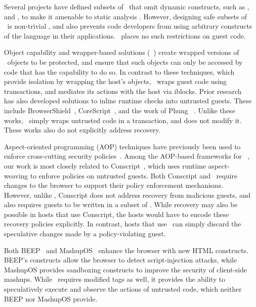 %
Several projects have defined subsets of \js\ that omit dynamic constructs, such
as ,  and , to make it amenable to static
analysis \cite{adsafe,fbjs,caja,gatekeeper:sec09}. However, designing
safe subsets of \js\ is non-trivial
\cite{language:csf09,semantics:aplas08,mmt10,leaks:ndss10}, and also prevents
code developers from using arbitrary constructs of the language in their
applications. \txjs\ places no such restrictions on guest code.

%
Object capability and wrapper-based solutions
(\eg~\cite{views:www10,mmt10,wrappers:esorics09}) create wrapped versions of
\js\ objects to be protected, and ensure that such objects can only be accessed
by code that has the capability to do so. In contrast to these techniques,
which provide isolation by wrapping the host's objects, \txjs\ wraps guest code
using  transactions, and mediates its actions with the host via
iblocks.  Prior research has also developed solutions to inline
runtime checks into untrusted guests. These include
BrowserShield~\cite{browsershield}, CoreScript~\cite{corescript:popl07}, and
the work of Phung \etal~\cite{phung:asiaccs09}. Unlike these works, \txjs\
simply wraps untrusted code in a transaction, and does not modify it. These
works also do not explicitly address recovery.


%
Aspect-oriented programming (AOP) techniques have previously been used to
enforce cross-cutting security
policies~\cite{evans:oak99,polymer:pldi05,ulfarthesis}. Among the AOP-based
frameworks for \js~\cite{conscript:oak10,washizaki}, our work is most closely
related to Conscript~\cite{conscript:oak10}, which uses runtime aspect-weaving
to enforce policies on untrusted guests.  Both Conscript and \txjs\ require
changes to the browser to support their policy enforcement mechanisms. However,
unlike \txjs, Conscript does not address recovery from malicious guests, and
also requires guests to be written in a subset of \js.  While recovery may also
be possible in hosts that use Conscript, the hosts would have to encode these
recovery policies explicitly.  In contrast, hosts that use \txjs\ can simply
discard the speculative changes made by a policy-violating guest.

%
Both BEEP~\cite{beep} and Mashup\-OS~\cite{mashupos} enhance the browser with
new HTML constructs. BEEP's constructs allow the browser to detect
script-injection attacks, while MashupOS provides sandboxing constructs to
improve the security of client-side mashups. While \txjs\ requires modified
\html{script} tags as well, it provides the ability to speculatively execute
and observe the actions of untrusted code, which neither BEEP nor MashupOS
provide. 

